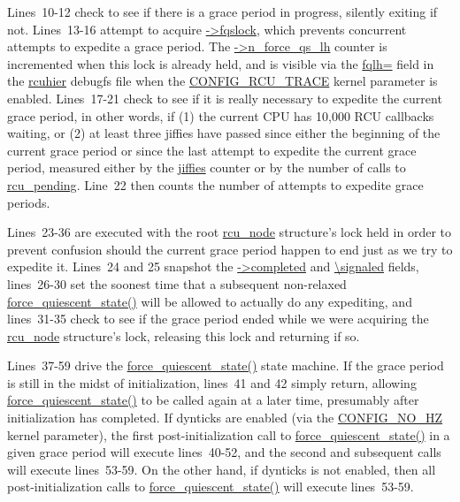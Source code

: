 Lines~10-12 check to see if there is a grace period in progress,
silently exiting if not.
Lines~13-16 attempt to acquire \url{->fqslock}, which prevents concurrent
attempts to expedite a grace period.
The \url{->n_force_qs_lh} counter is incremented when this lock is
already held, and is visible via the \url{fqlh=} field
in the \url{rcuhier} debugfs file when the \url{CONFIG_RCU_TRACE} kernel
parameter is enabled.
Lines~17-21 check to see if it is really necessary to expedite the
current grace period, in other words, if (1) the current CPU has 10,000
RCU callbacks waiting, or (2) at least three jiffies have passed
since either the beginning of the current grace period or since the
last attempt to expedite the current grace period, measured either
by the \url{jiffies} counter or by the number of calls to
\url{rcu_pending}.
Line~22 then counts the number of attempts to expedite grace periods.

Lines~23-36 are executed with the root \url{rcu_node} structure's lock
held in order to prevent confusion should the current grace period
happen to end just as we try to expedite it.
Lines~24 and 25 snapshot the \url{->completed} and \url{\signaled} fields,
lines~26-30 set the soonest time that a subsequent non-relaxed
\url{force_quiescent_state()} will be allowed to actually do
any expediting, and lines~31-35 check to see if the grace period
ended while we were acquiring the \url{rcu_node} structure's lock,
releasing this lock and returning if so.

Lines~37-59 drive the \url{force_quiescent_state()} state machine.
If the grace period is still in the midst of initialization,
lines~41 and 42 simply return, allowing \url{force_quiescent_state()}
to be called again at a later time, presumably after initialization
has completed.
If dynticks are enabled (via the \url{CONFIG_NO_HZ} kernel
parameter), the first post-initialization call
to \url{force_quiescent_state()} in a given grace period will
execute lines~40-52, and the second and subsequent calls will
execute lines~53-59.
On the other hand, if dynticks is not enabled, then all post-initialization
calls to \url{force_quiescent_state()} will execute lines~53-59.


